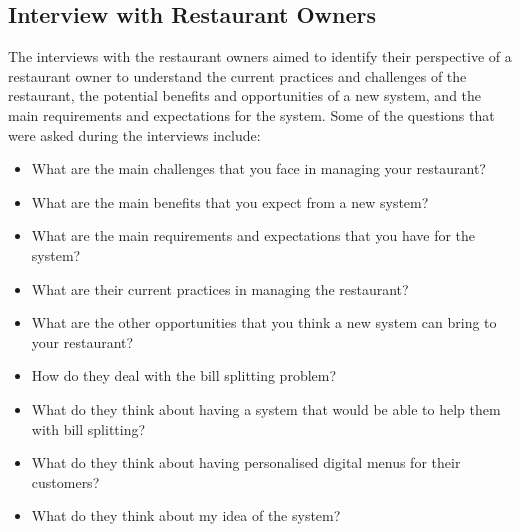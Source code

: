 \subsection*{Interview with Restaurant Owners}
The interviews with the restaurant owners aimed to identify their perspective of a restaurant owner to understand the current practices and challenges of the restaurant, the potential benefits and opportunities of a new system, and the main requirements and expectations for the system. Some of the questions that were asked during the interviews include:
\begin{itemize}
    \item What are the main challenges that you face in managing your restaurant?
    \item What are the main benefits that you expect from a new system?
    \item What are the main requirements and expectations that you have for the system?
    \item What are their current practices in managing the restaurant?
    \item What are the other opportunities that you think a new system can bring to your restaurant?
    \item How do they deal with the bill splitting problem?
    \item What do they think about having a system that would be able to help them with bill splitting?
    \item What do they think about having personalised digital menus for their customers?
    \item What do they think about my idea of the system?
\end{itemize}

